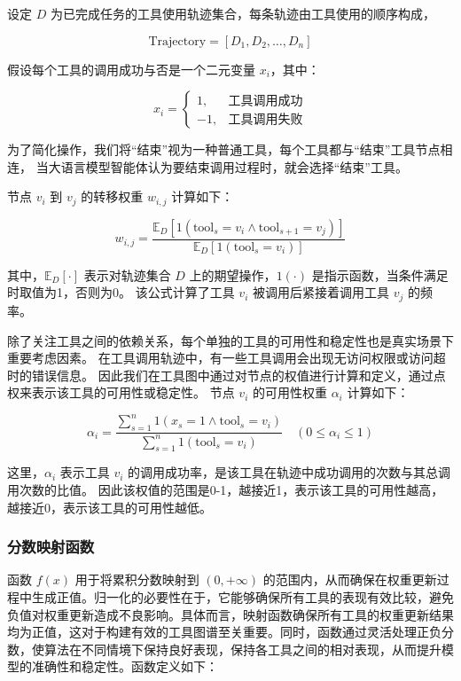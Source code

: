 设定 $D$ 为已完成任务的工具使用轨迹集合，每条轨迹由工具使用的顺序构成，

\[
\text{Trajectory} = [D_1, D_2, \ldots, D_n]
\]

假设每个工具的调用成功与否是一个二元变量 $x_i$，其中：

\[
x_i = 
\begin{cases} 
1, & \text{工具调用成功} \\
-1, & \text{工具调用失败}
\end{cases}
\]

为了简化操作，我们将“结束”视为一种普通工具，每个工具都与“结束”工具节点相连，
当大语言模型智能体认为要结束调用过程时，就会选择“结束”工具。

节点 $v_i$ 到 $v_j$ 的转移权重 $w_{i,j}$ 计算如下：

\[
w_{i,j} = \frac{\mathbb{E}_D[1(\text{tool}_s = v_i \land \text{tool}_{s+1} = v_j)]}{\mathbb{E}_D[1(\text{tool}_s = v_i)]}
\]

其中，$\mathbb{E}_D[\cdot]$ 表示对轨迹集合 $D$ 上的期望操作，$1(\cdot)$ 是指示函数，当条件满足时取值为1，否则为0。
该公式计算了工具 $v_i$ 被调用后紧接着调用工具 $v_j$ 的频率。

除了关注工具之间的依赖关系，每个单独的工具的可用性和稳定性也是真实场景下重要考虑因素。
在工具调用轨迹中，有一些工具调用会出现无访问权限或访问超时的错误信息。
因此我们在工具图中通过对节点的权值进行计算和定义，通过点权来表示该工具的可用性或稳定性。
节点 $v_i$ 的可用性权重 $\alpha_i$ 计算如下：

\[
\alpha_i = \frac{\sum_{s=1}^{n} 1(x_s = 1 \land \text{tool}_s = v_i)}{\sum_{s=1}^{n} 1(\text{tool}_s = v_i)} \quad (0 \leq \alpha_i \leq 1)
\]

这里，$\alpha_i$ 表示工具 $v_i$ 的调用成功率，是该工具在轨迹中成功调用的次数与其总调用次数的比值。
因此该权值的范围是0-1，越接近1，表示该工具的可用性越高，越接近0，表示该工具的可用性越低。

\subsubsection{分数映射函数}

函数 $f(x)$ 用于将累积分数映射到 $(0, +\infty)$ 的范围内，从而确保在权重更新过程中生成正值。归一化的必要性在于，它能够确保所有工具的表现有效比较，避免负值对权重更新造成不良影响。具体而言，映射函数确保所有工具的权重更新结果均为正值，这对于构建有效的工具图谱至关重要。同时，函数通过灵活处理正负分数，使算法在不同情境下保持良好表现，保持各工具之间的相对表现，从而提升模型的准确性和稳定性。函数定义如下：

